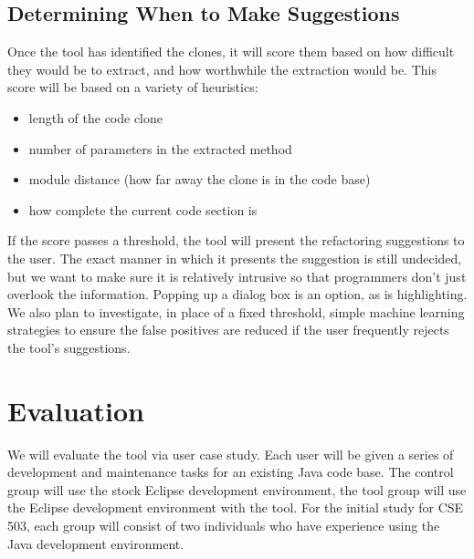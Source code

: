 \documentclass[preprint,10pt]{sigplanconf}
\begin{document}
\subsection{Determining When to Make Suggestions}
Once the tool has identified the clones, it will score them based on how difficult they would be to extract, and how worthwhile the extraction would be. This score will be based on a variety of heuristics:

\begin{itemize}
  \item length of the code clone
  \item number of parameters in the extracted method
  \item module distance (how far away the clone is in the code base)
  \item how complete the current code section is
\end{itemize}

If the score passes a threshold, the tool will present the refactoring suggestions to the user. The exact manner in which it presents the suggestion is still undecided, but we want to make sure it is relatively intrusive so that programmers don't just overlook the information. Popping up a dialog box is an option, as is highlighting. We also plan to investigate, in place of a fixed threshold, simple machine learning strategies to ensure the false positives are reduced if the user frequently rejects the tool's suggestions.

\section{Evaluation}


We will evaluate the tool via user case study. Each user will be given
a series of development and maintenance tasks for an existing Java
code base. The control group will use the stock Eclipse development
environment, the tool group will use the Eclipse development
environment with the tool. For the initial study for CSE 503, each
group will consist of two individuals who have experience using the
Java development environment.
\end{document}
